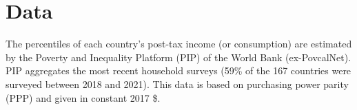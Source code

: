 \section{Data}\label{subsec:data}
The percentiles of each country's post-tax income (or consumption) are estimated by the Poverty and Inequality Platform (PIP) of the World Bank (ex-PovcalNet). PIP aggregates the most recent household surveys (59\% of the 167 countries were surveyed between 2018 and 2021). This data is based on purchasing power parity (PPP) and given in constant 2017 \$. %

